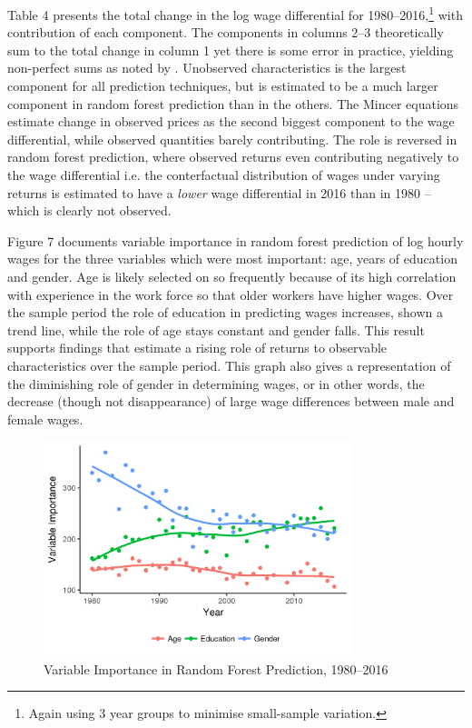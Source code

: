 \documentclass[notitlepage,12pt]{article}
\begin{document}
Table 4 presents the total change in the log wage differential for 1980--2016,\footnote{Again using 3 year groups to minimise small-sample variation.} with contribution of each component.  The components in columns 2--3 theoretically sum to the total change in column 1 yet there is some error in practice, yielding non-perfect sums as noted by \cite{autor200914}.  Unobserved characteristics is the largest component for all prediction techniques, but is estimated to be a much larger component in random forest prediction than in the others.  The Mincer equations estimate change in observed prices as the second biggest component to the wage differential, while observed quantities barely contributing.  The role is reversed in random forest prediction, where observed returns even contributing negatively to the wage differential i.e. the conterfactual distribution of wages under varying returns is estimated to have a \textit{lower} wage differential in 2016 than in 1980 -- which is clearly not observed.

Figure 7 documents variable importance in random forest prediction of log hourly wages for the three variables which were most important: age, years of education and gender.  Age is likely selected on so frequently because of its high correlation with experience in the work force so that older workers have higher wages.  Over the sample period the role of education in predicting wages increases, shown a trend line, while the role of age stays constant and gender falls.  This result supports findings that estimate a rising role of returns to observable characteristics over the sample period.  This graph also gives a representation of the diminishing role of gender in determining wages, or in other words, the decrease (though not disappearance) of large wage differences between male and female wages.
\begin{figure}[H]
  \centering
  \includegraphics[width=0.8\textwidth]{importance_graph.png}
  \caption{Variable Importance in Random Forest Prediction, 1980--2016}
\end{figure}
\end{document}
